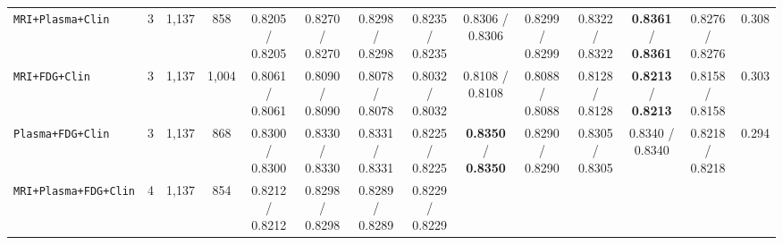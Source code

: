 \documentclass[10pt,twocolumn]{article}
\begin{document}
\begin{table}[t]
{\begin{tabular}{@{}>{\raggedright\arraybackslash}p{2.65cm}ccccccccccccc@{}}
\texttt{MRI+Plasma+Clin} & 3 & 1,137 & 858 & \shortstack{0.8205 /\\0.8205} & \shortstack{0.8270
/\\0.8270} & \shortstack{0.8298 /\\0.8298} & \shortstack{0.8235 /\\0.8235} &
\shortstack{0.8306 /\\0.8306} & \shortstack{0.8299 /\\0.8299} & \shortstack{0.8322 /\\0.8322} &
\shortstack{\textbf{0.8361} /\\\textbf{0.8361}} & \shortstack{0.8276 /\\0.8276} & 0.308 \\
\texttt{MRI+FDG+Clin} & 3 & 1,137 & 1,004 & \shortstack{0.8061 /\\0.8061} & \shortstack{0.8090
/\\0.8090} & \shortstack{0.8078 /\\0.8078} & \shortstack{0.8032 /\\0.8032} & \shortstack{0.8108
/\\0.8108} & \shortstack{0.8088 /\\0.8088} & \shortstack{0.8128 /\\0.8128} &
\shortstack{\textbf{0.8213} /\\\textbf{0.8213}} & \shortstack{0.8158 /\\0.8158} & 0.303 \\
\texttt{Plasma+FDG+Clin} & 3 & 1,137 & 868 & \shortstack{0.8300 /\\0.8300} & \shortstack{0.8330
/\\0.8330} & \shortstack{0.8331 /\\0.8331} & \shortstack{0.8225 /\\0.8225} &
\shortstack{\textbf{0.8350} /\\\textbf{0.8350}} & \shortstack{0.8290 /\\0.8290} &
\shortstack{0.8305 /\\0.8305} & \shortstack{0.8340 /\\0.8340} &
\shortstack{0.8218 /\\0.8218} & 0.294 \\
\midrule
\texttt{MRI+Plasma+FDG+Clin} & 4 & 1,137 & 854 & \shortstack{0.8212 /\\0.8212} &
\shortstack{0.8298 /\\0.8298} & \shortstack{0.8289 /\\0.8289} & \shortstack{0.8229 /\\0.8229} &

\end{tabular}}
\end{table}
\end{document}
